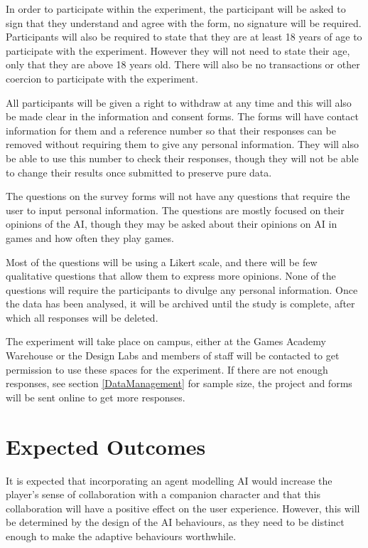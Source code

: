 \documentclass{IEEEtran}
\begin{document}
In order to participate within the experiment, the participant will be asked to sign that they understand and agree with the form, no signature will be required. Participants will also be required to state that they are at least 18 years of age to participate with the experiment. However they will not need to state their age, only that they are above 18 years old. There will also be no transactions or other coercion to participate with the experiment.

All participants will be given a right to withdraw at any time and this will also be made clear in the information and consent forms. The forms will have contact information for them and a reference number so that their responses can be removed without requiring them to give any personal information. They will also be able to use this number to check their responses, though they will not be able to change their results once submitted to preserve pure data.

The questions on the survey forms will not have any questions that require the user to input personal information. The questions are mostly focused on their opinions of the AI, though they may be asked about their opinions on AI in games and how often they play games.

Most of the questions will be using a Likert scale, and there will be few qualitative questions that allow them to express more opinions. None of the questions will require the participants to divulge any personal information. Once the data has been analysed, it will be archived until the study is complete, after which all responses will be deleted.

The experiment will take place on campus, either at the Games Academy Warehouse or the Design Labs and members of staff will be contacted to get permission to use these spaces for the experiment. If there are not enough responses, see section \ref{DataManagement} for sample size, the project and forms will be sent online to get more responses.

\section{Expected Outcomes}
\label{ExpectedOutcomes}

It is expected that incorporating an agent modelling AI would increase the player's sense of collaboration with a companion character and that this collaboration will have a positive effect on the user experience. However, this will be determined by the design of the AI behaviours, as they need to be distinct enough to make the adaptive behaviours worthwhile.
\end{document}
